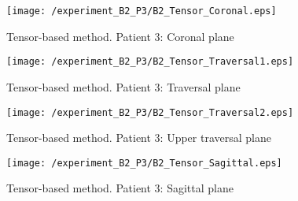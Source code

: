 \begin{figure}[H]
  \centering
  \texttt{[image: /experiment\_B2\_P3/B2\_Tensor\_Coronal.eps]}
  \caption{Tensor-based method. Patient 3: Coronal plane}
  \label{B2_TCoronal}
\end{figure}

\begin{figure}[H]
  \centering
  \texttt{[image: /experiment\_B2\_P3/B2\_Tensor\_Traversal1.eps]}
  \caption{Tensor-based method. Patient 3: Traversal plane}
  \label{B2_TTraversal1}
\end{figure}

\begin{figure}[H]
  \centering
  \texttt{[image: /experiment\_B2\_P3/B2\_Tensor\_Traversal2.eps]}
  \caption{Tensor-based method. Patient 3: Upper traversal plane}
  \label{B2_TTraversal2}
\end{figure}

\begin{figure}[H]
  \centering
  \texttt{[image: /experiment\_B2\_P3/B2\_Tensor\_Sagittal.eps]}
  \caption{Tensor-based method. Patient 3: Sagittal plane}
  \label{B2_TSagittal}
\end{figure}